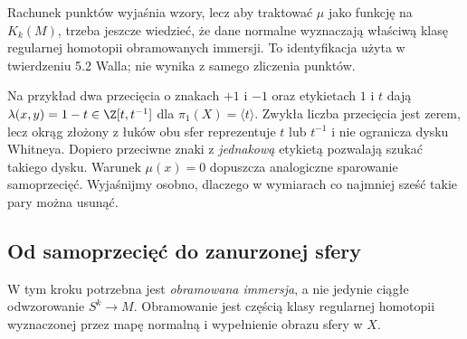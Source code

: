 Rachunek punktów wyjaśnia wzory, lecz aby
traktować $\mu$ jako funkcję na $K_k(M)$,
trzeba jeszcze wiedzieć, że dane normalne
wyznaczają właściwą klasę regularnej homotopii
obramowanych immersji. To identyfikacja
użyta w twierdzeniu 5.2 Walla; nie wynika
z samego zliczenia punktów.

Na przykład dwa przecięcia o znakach $+1$ i $-1$
oraz etykietach $1$ i $t$ dają
$\lambda(x,y)=1-t\in\Z[t,t^{-1}]$ dla
$\pi_1(X)=\langle t\rangle$. Zwykła liczba
przecięcia jest zerem, lecz okrąg złożony z
łuków obu sfer reprezentuje $t$ lub $t^{-1}$
i nie ogranicza
dysku Whitneya. Dopiero przeciwne znaki z
\emph{jednakową} etykietą pozwalają szukać
takiego dysku. Warunek $\mu(x)=0$ dopuszcza
analogiczne sparowanie samoprzecięć. Wyjaśnijmy
osobno, dlaczego w wymiarach co najmniej sześć
takie pary można usunąć.

\subsection*{Od samoprzecięć do zanurzonej sfery}
W tym kroku potrzebna jest \emph{obramowana
immersja}, a nie jedynie ciągłe odwzorowanie
$S^k\to M$. Obramowanie jest częścią klasy
regularnej homotopii wyznaczonej przez mapę
normalną i wypełnienie obrazu sfery w $X$.

